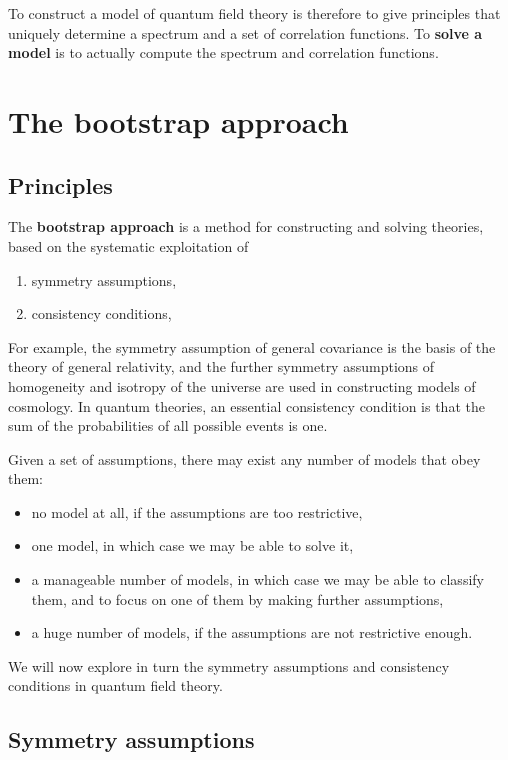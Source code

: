 \documentclass[12pt, a4paper, notitlepage, twoside]{report}
\numberwithin{equation}{section}
\theoremstyle{break}
\begin{document}
To construct a model of quantum field theory is therefore to give principles that uniquely determine a spectrum and a set of correlation functions.
To \textbf{\boldmath solve a model} is to actually compute the spectrum and correlation functions. 

\section{The bootstrap approach}

\subsection{Principles \label{secprin}}

The \textbf{\boldmath bootstrap approach} is a method for constructing and solving theories, based on the systematic exploitation of 
\begin{enumerate}
 \item symmetry assumptions,
 \item consistency conditions,
\end{enumerate}
For example, the symmetry assumption of general covariance is the basis of the theory of general relativity, and the further symmetry assumptions of homogeneity and isotropy of the universe are used in constructing models of cosmology.
In quantum theories, an essential consistency condition is that the sum of the probabilities of all possible events is one. 

Given a set of assumptions, there may exist any number of models that obey them:
\begin{itemize}
 \item no model at all, if the assumptions are too restrictive,
\item one model, in which case we may be able to solve it,
\item a manageable number of models, in which case we may be able to classify them, and to focus on one of them by making further assumptions,
\item a huge number of models, if the assumptions are not restrictive enough.
\end{itemize}
We will now explore in turn the symmetry assumptions and consistency conditions in quantum field theory. 

\subsection{Symmetry assumptions \label{secsa}}
\end{document}
